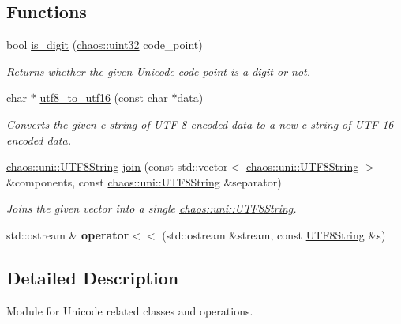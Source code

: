 \subsection*{Functions}
\begin{DoxyCompactItemize}
\item 
bool \hyperlink{namespacechaos_1_1uni_a25a7549a0378aeac227c881220c23640}{is\+\_\+digit} (\hyperlink{namespacechaos_a3b3a47ba1e284655bf1a30c441121c60}{chaos\+::uint32} code\+\_\+point)
\begin{DoxyCompactList}\small\item\em Returns whether the given Unicode code point is a digit or not. \end{DoxyCompactList}\item 
char $\ast$ \hyperlink{namespacechaos_1_1uni_a9659635a08a35ad4e612a3b7261811be}{utf8\+\_\+to\+\_\+utf16} (const char $\ast$data)
\begin{DoxyCompactList}\small\item\em Converts the given c string of U\+T\+F-\/8 encoded data to a new c string of U\+T\+F-\/16 encoded data. \end{DoxyCompactList}\item 
\hyperlink{classchaos_1_1uni_1_1_u_t_f8_string}{chaos\+::uni\+::\+U\+T\+F8\+String} \hyperlink{namespacechaos_1_1uni_ad2a77983423c8b10e2b18cae6f35d329}{join} (const std\+::vector$<$ \hyperlink{classchaos_1_1uni_1_1_u_t_f8_string}{chaos\+::uni\+::\+U\+T\+F8\+String} $>$ \&components, const \hyperlink{classchaos_1_1uni_1_1_u_t_f8_string}{chaos\+::uni\+::\+U\+T\+F8\+String} \&separator)
\begin{DoxyCompactList}\small\item\em Joins the given vector into a single \hyperlink{classchaos_1_1uni_1_1_u_t_f8_string}{chaos\+::uni\+::\+U\+T\+F8\+String}. \end{DoxyCompactList}\item 
\hypertarget{namespacechaos_1_1uni_ab20a8223562ec1ee8f663bda07c7a3ad}{}std\+::ostream \& {\bfseries operator$<$$<$} (std\+::ostream \&stream, const \hyperlink{classchaos_1_1uni_1_1_u_t_f8_string}{U\+T\+F8\+String} \&s)\label{namespacechaos_1_1uni_ab20a8223562ec1ee8f663bda07c7a3ad}

\end{DoxyCompactItemize}


\subsection{Detailed Description}
Module for Unicode related classes and operations. 

